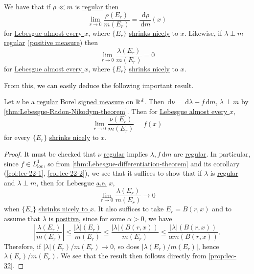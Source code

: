 \begin{prev}
	We have that if \(\rho \ll m\) is \hyperref[def:regular]{regular} then
	\[
		\lim_{r \to 0} \frac{\rho(E_r)}{m(E_r)} = \frac{\,\mathrm{d}\rho}{\,\mathrm{d}m}(x)
	\]
	for \hyperref[def:mu-almost-everywhere]{Lebesgue almost every \(x\)}, where \(\{E_r\}\) \hyperref[def:shrink-nicely]{shrinks nicely} to \(x\).
	Likewise, if \(\lambda \perp m\) \hyperref[def:regular]{regular} (\hyperref[def:signed-measure]{positive measure}) then
	\[
		\lim_{r \to 0} \frac{\lambda(E_r)}{m(E_r)} = 0
	\]
	for \hyperref[def:mu-almost-everywhere]{Lebesgue almost every \(x\)}, where \(\{E_r\}\) \hyperref[def:shrink-nicely]{shrinks nicely} to \(x\).
\end{prev}

From this, we can easily deduce the following important result.
\begin{theorem}\label{thm:Lebesgue-differentiation-theorem-for-regular-measure}
	Let \(\nu\) be a \hyperref[def:regular]{regular} Borel \hyperref[def:signed-measure]{signed measure} on \(\mathbb{\MakeUppercase{r}} ^d\).
	Then \(\,\mathrm{d}\nu = \,\mathrm{d}\lambda + f \,\mathrm{d}m\), \(\lambda \perp m\) by \autoref{thm:Lebesgue-Radon-Nikodym-theorem}.
	Then for \hyperref[def:mu-almost-everywhere]{Lebesgue almost every \(x\)},
	\[
		\lim_{r \to 0} \frac{\nu(E_r)}{m(E_r)} = f(x)
	\]
	for every \(\{E_r\}\) \hyperref[def:shrink-nicely]{shrinks nicely} to \(x\).
\end{theorem}
\begin{proof}
	It must be checked that \(\nu\) \hyperref[def:regular]{regular} implies \(\lambda, f \,\mathrm{d}m\) are \hyperref[def:regular]{regular}.
	In particular, since \(f\in L^1_{\mathrm{loc} } \), so from \autoref{thm:Lebesgue-differentiation-theorem} and its corollary (\autoref{col:lec-22-1}, \autoref{col:lec-22-2}),
	we see that it suffices to show that if \(\lambda \) is \hyperref[def:regular]{regular} and \(\lambda \perp m\),
	then for Lebesgue \hyperref[def:mu-almost-everywhere]{a.e.} \(x\),
	\[
		\lim\limits_{r \to 0} \frac{\lambda (E_{r} )}{m(E_{r} )}\to 0
	\]
	when \(\{E_{r} \}\) \hyperref[def:shrink-nicely]{shrinks nicely to \(x\)}. It also suffices to take \(E_{r} = B(r, x)\) and to assume that \(\lambda \) is
	\hyperref[def:signed-measure]{positive}, since for some \(\alpha >0\), we have
	\[
		\left\vert \frac{\lambda (E_{r} )}{m(E_{r} )} \right\vert
		\leq \frac{\left\vert \lambda \right\vert(E_{r} ) }{m(E_{r} )}
		\leq \frac{\left\vert \lambda \right\vert(B(r, x)) }{m(E_{r} )}
		\leq \frac{\left\vert \lambda \right\vert(B(r, x)) }{\alpha m(B(r, x))}.
	\]
	Therefore, if \(\left\vert \lambda \right\vert(E_{r} ) / m(E_{r} ) \to 0\), so does \(\left\vert \lambda (E_{r} ) / m(E_{r} ) \right\vert \),
	hence \(\lambda (E_{r} ) / m(E_{r} )\). We see that the result then follows directly from \autoref{prop:lec-32}.
\end{proof}

